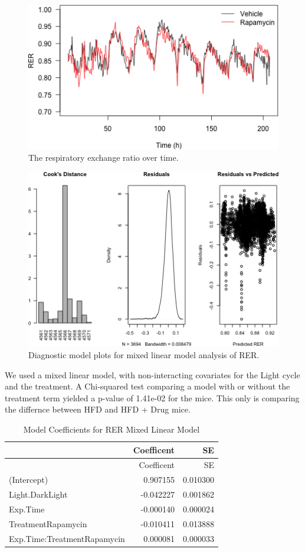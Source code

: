 \documentclass[]{article}
\begin{document}
\begin{figure}[htbp]
\centering
\includegraphics{figures/rer-time-course-1.png}
\caption{The respiratory exchange ratio over time.}
\end{figure}

\begin{figure}[htbp]
\centering
\includegraphics{figures/rer-statistics-untreated-1.png}
\caption{Diagnostic model plots for mixed linear model analysis of RER.}
\end{figure}

We used a mixed linear model, with non-interacting covariates for the
Light cycle and the treatment. A Chi-squared test comparing a model with
or without the treatment term yielded a p-value of 1.41e-02 for the
mice. This only is comparing the differnce between HFD and HFD + Drug
mice.

\begin{longtable}[c]{@{}lrr@{}}
\caption{Model Coefficients for RER Mixed Linear Model}\tabularnewline
\toprule
& Coefficent & SE\tabularnewline
\midrule
\endfirsthead
\toprule
& Coefficent & SE\tabularnewline
\midrule
\endhead
(Intercept) & 0.907155 & 0.010300\tabularnewline
Light.DarkLight & -0.042227 & 0.001862\tabularnewline
Exp.Time & -0.000140 & 0.000024\tabularnewline
TreatmentRapamycin & -0.010411 & 0.013888\tabularnewline
Exp.Time:TreatmentRapamycin & 0.000081 & 0.000033\tabularnewline
\bottomrule
\end{longtable}
\end{document}
